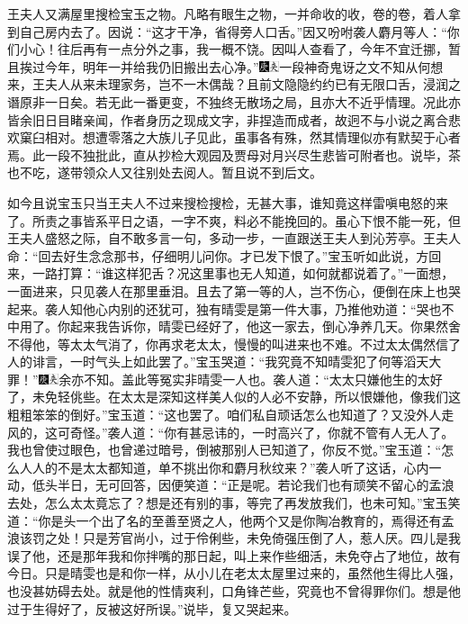 王夫人又满屋里搜检宝玉之物。凡略有眼生之物，一并命收的收，卷的卷，着人拿到自己房内去了。因说：``这才干净，省得旁人口舌。''因又吩咐袭人麝月等人：``你们小心！往后再有一点分外之事，我一概不饶。因叫人查看了，今年不宜迁挪，暂且挨过今年，明年一并给我仍旧搬出去心净。''{\includegraphics[width=3mm]{../Images/00004}\includegraphics[width=3mm]{../Images/00012}\footnotesize \kaishu 一段神奇鬼讶之文不知从何想来，王夫人从来未理家务，岂不一木偶哉？且前文隐隐约约已有无限口舌，浸润之谮原非一日矣。若无此一番更变，不独终无散场之局，且亦大不近乎情理。况此亦皆余旧日目睹亲闻，作者身历之现成文字，非捏造而成者，故迥不与小说之离合悲欢窠臼相对。想遭零落之大族儿子见此，虽事各有殊，然其情理似亦有默契于心者焉。此一段不独批此，直从抄检大观园及贾母对月兴尽生悲皆可附者也。}说毕，茶也不吃，遂带领众人又往别处去阅人。暂且说不到后文。

如今且说宝玉只当王夫人不过来搜检搜检，无甚大事，谁知竟这样雷嗔电怒的来了。所责之事皆系平日之语，一字不爽，料必不能挽回的。虽心下恨不能一死，但王夫人盛怒之际，自不敢多言一句，多动一步，一直跟送王夫人到沁芳亭。王夫人命：``回去好生念念那书，仔细明儿问你。才已发下恨了。''宝玉听如此说，方回来，一路打算：``谁这样犯舌？况这里事也无人知道，如何就都说着了。''一面想，一面进来，只见袭人在那里垂泪。且去了第一等的人，岂不伤心，便倒在床上也哭起来。袭人知他心内别的还犹可，独有晴雯是第一件大事，乃推他劝道：``哭也不中用了。你起来我告诉你，晴雯已经好了，他这一家去，倒心净养几天。你果然舍不得他，等太太气消了，你再求老太太，慢慢的叫进来也不难。不过太太偶然信了人的诽言，一时气头上如此罢了。''宝玉哭道：``我究竟不知晴雯犯了何等滔天大罪！''{\includegraphics[width=3mm]{../Images/00004}\includegraphics[width=3mm]{../Images/00012}\footnotesize \kaishu 余亦不知。盖此等冤实非晴雯一人也。}袭人道：``太太只嫌他生的太好了，未免轻佻些。在太太是深知这样美人似的人必不安静，所以恨嫌他，像我们这粗粗笨笨的倒好。''宝玉道：``这也罢了。咱们私自顽话怎么也知道了？又没外人走风的，这可奇怪。''袭人道：``你有甚忌讳的，一时高兴了，你就不管有人无人了。我也曾使过眼色，也曾递过暗号，倒被那别人已知道了，你反不觉。''宝玉道：``怎么人人的不是太太都知道，单不挑出你和麝月秋纹来？''袭人听了这话，心内一动，低头半日，无可回答，因便笑道：``正是呢。若论我们也有顽笑不留心的孟浪去处，怎么太太竟忘了？想是还有别的事，等完了再发放我们，也未可知。''宝玉笑道：``你是头一个出了名的至善至贤之人，他两个又是你陶冶教育的，焉得还有孟浪该罚之处！只是芳官尚小，过于伶俐些，未免倚强压倒了人，惹人厌。四儿是我误了他，还是那年我和你拌嘴的那日起，叫上来作些细活，未免夺占了地位，故有今日。只是晴雯也是和你一样，从小儿在老太太屋里过来的，虽然他生得比人强，也没甚妨碍去处。就是他的性情爽利，口角锋芒些，究竟也不曾得罪你们。想是他过于生得好了，反被这好所误。''说毕，复又哭起来。

